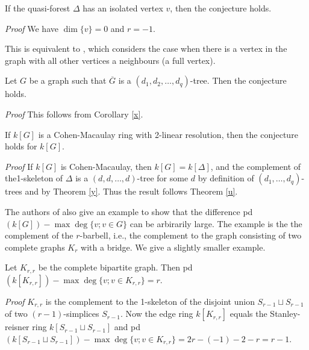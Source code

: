 \documentclass[11pt, oneside]{article}   	%
\begin{document}
\begin{cor}
If the quasi-forest $\Delta$ has an isolated vertex $v$, then the conjecture holds.
\end{cor}

\noindent
{\em Proof} We have $\dim\{v\}=0$ and $r=-1$.

\begin{rmk}
This is equivalent to \cite[Theorem 4.11]{a-m-n}, which considers the case when there is a vertex in the graph with all other vertices a neighbours (a full vertex).
\end{rmk}

\begin{theorem}\label{u}\cite[Theorem 4.21]{a-m-n}
Let $G$ be a graph such that $\overline G$ is a $(d_1,d_2,\ldots,d_q)$-tree. Then the conjecture holds.
\end{theorem}

\noindent
{\em Proof}
This follows from Corollary \ref{x}.

\begin{cor}
If $k[G]$ is a Cohen-Macaulay ring with 2-linear resolution, then the conjecture holds for $k[G]$.
\end{cor}

\noindent
{\em Proof} If $k[G]$ is Cohen-Macaulay, then $k[G]=k[\Delta]$, and the complement of the1-skeleton of $\Delta$ is a $(d,d,\ldots,d)$-tree for some $d$ by 
definition of $(d_1,\ldots,d_q)$-trees and by Theorem \ref{y}. 
Thus the result follows Theorem \ref{u}.

\begin{rmk}
The authors of \cite{a-m-n} also give an example to show that the difference pd$(k[G])-\max\deg \{ v;v\in G\}$ can be arbirarily large. The example is the 
the complement of the $r$-barbell, i.e., the complement to the graph consisting of two complete graphs $K_r$ with a bridge. We give a slightly smaller example.
\end{rmk}

\begin{cor}
Let $K_{r,r}$ be the complete bipartite graph. Then pd$(k[K_{r,r}])-\max\deg\{v;v\in K_{r,r}\}=r$.
\end{cor}

\noindent
{\em Proof} $K_{r,r}$ is the complement to the 1-skeleton of the disjoint union $S_{r-1}\sqcup S_{r-1}$ of two $(r-1)$-simplices $S_{r-1}$.
Now the edge ring $k[K_{r,r}]$ equals the Stanley-reisner ring $k[S_{r-1}\sqcup S_{r-1}]$ and pd$(k[S_{r-1}\sqcup S_{r-1}])-\max\deg\{v;v\in K_{r,r}\}=2r-(-1)-2-r=r-1$.
\end{document}
